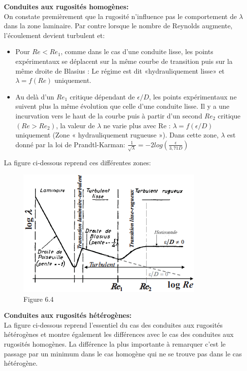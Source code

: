 \textbf{Conduites aux rugosités homogènes:} 
\\
On constate premièrement que la rugosité n'influence pas le comportement de $\lambda$ dans la zone laminaire. Par contre lorsque le nombre de Reynolds augmente, l'écoulement devient turbulent et:
\begin{itemize}
\item Pour $Re < Re_1$, comme dans le cas d’une conduite
lisse, les points expérimentaux se déplacent sur la même courbe de transition puis sur la même droite de
Blasius : Le régime est dit «hydrauliquement lisse» et
$\lambda=f(Re)$ uniquement.
\item Au delà d’un $Re_1$ critique dépendant de $\epsilon/D$, les points expérimentaux ne suivent plus la même évolution que celle d’une conduite lisse. Il y a une incurvation vers le haut de la courbe puis à partir d’un second $Re_2$ critique $(Re>Re_2)$, la valeur de $\lambda$ ne varie plus avec Re : $\lambda=f(\epsilon/D)$ uniquement (Zone « hydrauliquement rugueuse »). Dans cette zone, $\lambda$ est donné par la loi de Prandtl-Karman: $\frac{1}{\sqrt{\lambda}}=-2log(\frac{\epsilon}{3,71D})$
\\
\end{itemize}

La figure ci-dessous reprend ces différentes zones:
\begin{figure}[h]
\begin{center}
\includegraphics[scale=0.50]{ch6/65.png}
\caption*{Figure 6.4}
\end{center}
\end{figure}

\textbf{Conduites aux rugosités hétérogènes:} 
\\
La figure ci-dessous reprend l'essentiel du cas des conduites aux rugosités hétérogènes et montre également les différences avec le cas des conduites aux rugosités homogènes. La différence la plus importante à remarquer c'est le passage par un minimum dans le cas homogène qui ne se trouve pas dans le cas hétérogène.
\\

